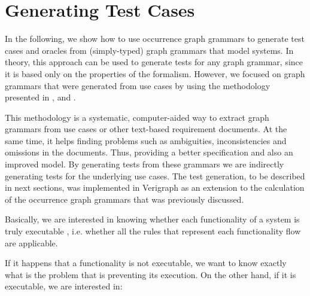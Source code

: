 \chapter{Generating Test Cases}\label{ch:tests}


In the following, we show how to use  occurrence graph grammars to generate test cases and oracles from (simply-typed) graph grammars that model systems. In theory, this approach can be used to generate tests for any graph grammar, since it is based only on the properties of the formalism. However, we focused on graph grammars that were generated from use cases by using the methodology presented in \cite{Junior2015}, \cite{BezerraWEIT2016} and \cite{Cota2017}.

This methodology is a systematic, computer-aided way to extract graph grammars from use cases or other text-based requirement documents. At the same time, it helps finding problems such as ambiguities, inconsistencies and omissions in the documents. Thus, providing a better specification and also an improved model. By generating tests from these grammars we are indirectly generating tests for the underlying use cases. The test generation, to be described in next sections, was implemented in Verigraph as an extension to the calculation of the occurrence graph grammars that was previously discussed.

Basically, we are interested in knowing whether each functionality of a system is truly executable , i.e. whether all the rules that represent each functionality flow are applicable.

If it happens that a functionality is not executable, we want to know exactly what is the problem that is preventing its execution. On the other hand, if it is executable, we are interested in:

